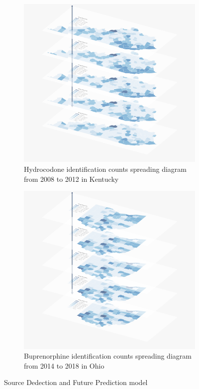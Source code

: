 \documentclass{mcmthesis}
\begin{document}
\begin{figure}[H]
    \centering
    \begin{subfigure}[b]{0.49\textwidth}
        \includegraphics[width=\textwidth]{../figure/KY_Hydrocodone} 
	\caption{Hydrocodone identification counts spreading diagram from 2008 to 2012 in  Kentucky} 
	\label{KY_Hydrocodone}  
    \end{subfigure}
    \begin{subfigure}[b]{0.49\textwidth}
        \includegraphics[width=\textwidth]{../figure/OH_Buprenorphine} 
	\caption{Buprenorphine identification counts spreading diagram from 2014 to 2018 in Ohio} 
	\label{OH_Buprenorphine}  
    \end{subfigure}
    \caption{ Source Dedection and Future Prediction model }\label{fig:cool}
\end{figure}
\end{document}
